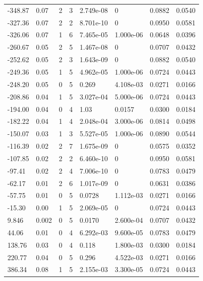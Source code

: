 \documentclass[preview]{standalone}
\begin{document}
{{\begin{tabular}{L{1.2cm}C{1.2cm} C{0.3cm}C{0.5cm} C{1.4cm}C{1.4cm} C{1.4cm}C{1.4cm}}
  -348.87  &  0.07  & 2     &  3 &  2.749e-08  & 0  & 0.0882 &  0.0540   \\ 
  -327.36  &  0.07  & 2     &  2 &  8.701e-10  & 0  & 0.0950 &  0.0581   \\ 
  -326.06  &  0.07  & 1     &  6 &  7.465e-05  & 1.000e-06  & 0.0648 &  0.0396   \\ 
  -260.67  &  0.05  & 2     &  5 &  1.467e-08  & 0  & 0.0707 &  0.0432   \\ 
  -252.62  &  0.05  & 2     &  3 &  1.643e-09  & 0  & 0.0882 &  0.0540   \\ 
  -249.36  &  0.05  & 1     &  5 &  4.962e-05  & 1.000e-06  & 0.0724 &  0.0443   \\ 
  -248.20  &  0.05  & 0     &  5 &  0.269  & 4.108e-03  & 0.0271 &  0.0166   \\ 
  -208.86  &  0.04  & 1     &  5 &  3.027e-04  & 5.000e-06  & 0.0724 &  0.0443   \\ 
  -194.00  &  0.04  & 0     &  4 &  1.03  & 0.0157  & 0.0300 &  0.0184   \\ 
  -182.22  &  0.04  & 1     &  4 &  2.048e-04  & 3.000e-06  & 0.0814 &  0.0498   \\ 
  -150.07  &  0.03  & 1     &  3 &  5.527e-05  & 1.000e-06  & 0.0890 &  0.0544   \\ 
  -116.39  &  0.02  & 2     &  7 &  1.675e-09  & 0  & 0.0575 &  0.0352   \\ 
  -107.85  &  0.02  & 2     &  2 &  6.460e-10  & 0  & 0.0950 &  0.0581   \\ 
  -97.41  &  0.02  & 2     &  4 &  7.006e-10  & 0  & 0.0783 &  0.0479   \\ 
  -62.17  &  0.01  & 2     &  6 &  1.017e-09  & 0  & 0.0631 &  0.0386   \\ 
  -57.75  &  0.01  & 0     &  5 &  0.0728  & 1.112e-03  & 0.0271 &  0.0166   \\ 
  -15.30  &  0.00  & 1     &  5 &  2.069e-05  & 0  & 0.0724 &  0.0443   \\ 
  9.846  &  0.002  & 0     &  5 &  0.0170  & 2.600e-04  & 0.0707 &  0.0432   \\ 
  44.06  &  0.01  & 0     &  4 &  6.292e-03  & 9.600e-05  & 0.0783 &  0.0479   \\ 
  138.76  &  0.03  & 0     &  4 &  0.118  & 1.800e-03  & 0.0300 &  0.0184   \\ 
  220.77  &  0.04  & 0     &  5 &  0.296  & 4.522e-03  & 0.0271 &  0.0166   \\ 
  386.34  &  0.08  & 1     &  5 &  2.155e-03  & 3.300e-05  & 0.0724 &  0.0443   \\ 

\end{tabular}}}
\end{document}
